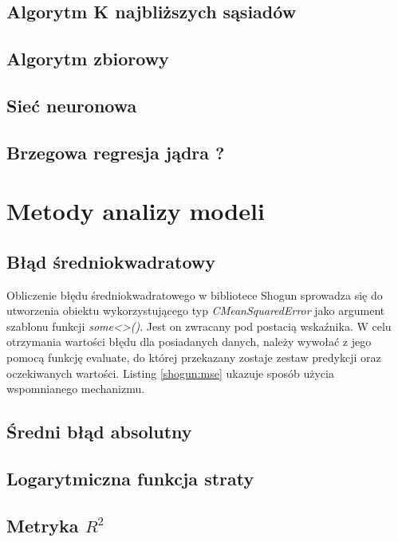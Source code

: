 \subsection{Algorytm K najbliższych sąsiadów}
\subsection{Algorytm zbiorowy}
\subsection{Sieć neuronowa}
\subsection{Brzegowa regresja jądra ?}

\section{Metody analizy modeli}

\subsection{Błąd średniokwadratowy}

Obliczenie błędu średniokwadratowego w bibliotece Shogun sprowadza się do utworzenia obiektu wykorzystującego typ \textit{CMeanSquaredError} jako argument szablonu funkcji \textit{some<>()}. Jest on zwracany pod postacią wskaźnika. W celu otrzymania wartości błędu dla posiadanych danych, należy wywołać z jego pomocą funkcję evaluate, do której przekazany zostaje zestaw predykcji oraz oczekiwanych wartości. Listing \ref{shogun:mse} ukazuje sposób użycia wspomnianego mechanizmu.


\subsection{Średni błąd absolutny}

\subsection{Logarytmiczna funkcja straty}
\subsection{Metryka $R^2$}
